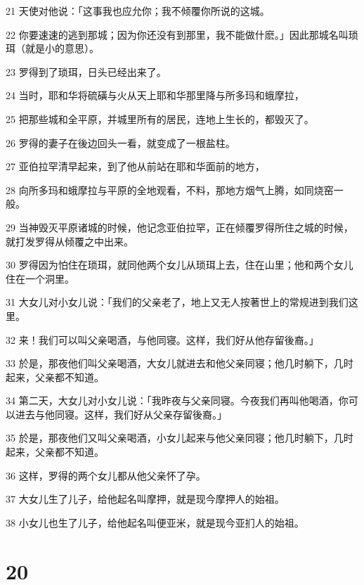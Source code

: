 \par 21 天使对他说：「这事我也应允你；我不倾覆你所说的这城。
\par 22 你要速速的逃到那城；因为你还没有到那里，我不能做什麽。」因此那城名叫琐珥（就是小的意思）。
\par 23 罗得到了琐珥，日头已经出来了。
\par 24 当时，耶和华将硫磺与火从天上耶和华那里降与所多玛和蛾摩拉，
\par 25 把那些城和全平原，并城里所有的居民，连地上生长的，都毁灭了。
\par 26 罗得的妻子在後边回头一看，就变成了一根盐柱。
\par 27 亚伯拉罕清早起来，到了他从前站在耶和华面前的地方，
\par 28 向所多玛和蛾摩拉与平原的全地观看，不料，那地方烟气上腾，如同烧窑一般。
\par 29 当神毁灭平原诸城的时候，他记念亚伯拉罕，正在倾覆罗得所住之城的时候，就打发罗得从倾覆之中出来。
\par 30 罗得因为怕住在琐珥，就同他两个女儿从琐珥上去，住在山里；他和两个女儿住在一个洞里。
\par 31 大女儿对小女儿说：「我们的父亲老了，地上又无人按著世上的常规进到我们这里。
\par 32 来！我们可以叫父亲喝酒，与他同寝。这样，我们好从他存留後裔。」
\par 33 於是，那夜他们叫父亲喝酒，大女儿就进去和他父亲同寝；他几时躺下，几时起来，父亲都不知道。
\par 34 第二天，大女儿对小女儿说：「我昨夜与父亲同寝。今夜我们再叫他喝酒，你可以进去与他同寝。这样，我们好从父亲存留後裔。」
\par 35 於是，那夜他们又叫父亲喝酒，小女儿起来与他父亲同寝；他几时躺下，几时起来，父亲都不知道。
\par 36 这样，罗得的两个女儿都从他父亲怀了孕。
\par 37 大女儿生了儿子，给他起名叫摩押，就是现今摩押人的始祖。
\par 38 小女儿也生了儿子，给他起名叫便亚米，就是现今亚扪人的始祖。

\chapter{20}

